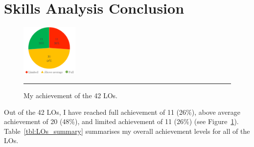 
\section{Skills Analysis Conclusion} \label{sec:skills_ccl}


\begin{figure}
	\centering
	\includegraphics[width=0.25\textwidth]{figures/LO_pie_3.png}
	\rule{0.25\textwidth}{0.5pt} %
	\caption{My achievement of the 42 LOs.}
	\label{fig:LO_pie}
\end{figure}

Out of the 42 LOs, I have reached full achievement of 11 (26\%), above average achievement of 20 (48\%), and limited achievement of 11 (26\%) (see Figure~\ref{fig:LO_pie}).
Table~\ref{tbl:LOs_summary} summarises my overall achievement levels for all of the LOs.


